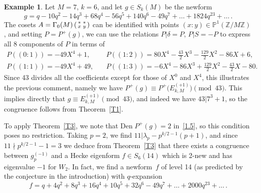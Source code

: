 \documentclass{amsart}
\theoremstyle{plain}
\theoremstyle{definition}
\newtheorem{example}[theorem]{Example}
\numberwithin{equation}{section}
\newcommand{\Z}{{\mathbb Z}}
\newcommand{\Q}{{\mathbb Q}}
\newcommand{\C}{{\mathbb C}}
\newcommand{\R}{{\mathbb R}}
\def\PP{\mathbb{P}} \def\MM{\mathbb{M}}\def\Q{\mathbb{Q}}\def\R{\mathbb{R}}\def\Z{\mathbb{Z}}\def\C{\mathbb{C}}
\def\dd{\delta} \def\ss{\sigma}\def\wc{\widetilde{\chi}}
\def\sm#1#2#3#4{\left(\begin{smallmatrix}#1&#2 \\ #3 & #4 \end{smallmatrix}\right)}
\def\den{\mathrm{Den}\;}
\begin{document}
\begin{example}\label{ex3} Let $M=7$, $k=6$, and let $g\in S_k(M)$ be the 
newform  
\[ g=  q - 10 q^2 - 14 q^3 + 68 q^4 - 56 q^5 + 140 q^6 - 49 q^7 +\ldots 
+1824q^{23}+\ldots\,. \] 
The cosets $A=\G_0(M)\sm **xy$ can be identified with points $(x:y)\in 
\PP^1(\Z/M\Z)$, and setting $P=P^+(g)$, we can use the relations 
$P|\dd=P$, $P|S=-P$ to express all 8 components of $P$ in terms of 
\[\begin{aligned}
  P((0:1))=-49X^4 + 1, \quad & 
  P((1:2))=80X^4 - \frac{43}2 X^3 - \frac{129}2 X^2 - 86X + 6, \\
  P((1:1))=-49X^4 + 49, \quad & 
  P((1:3))=-6X^4 - 86X^3 + \frac{129}2 X^2 - \frac{43}2 X - 80.
   \end{aligned}
\]
Since 43 divides all the coefficients except for those of $X^0$ and $X^4$, this 
illustrates the previous comment, namely we have 
$P^+(g)\equiv P^+\big(E_{k,M}^{(+1)}\big)\!\!\pmod{43}$.
This implies directly that $g\equiv E_{k,M}^{(+1)} \pmod{43}$, and  
indeed we have $43|7^3+1$, so the congruence follows from Theorem~\ref{T1}. 

To apply Theorem~\ref{T3}, we note that $\den P^+(g)=2$ in~\eqref{1.5}, 
so this condition poses no restriction. 
Taking $p=2$, we find $11|\lambda_p-p^{k/2-1}(p+1)$, and since 
$11\nmid p^{k/2-1}-1=3$ we deduce from Theorem~\ref{T3} that there exists 
a congruence between $g_p^{(-1)}$  
and a Hecke eigenform $f\in S_6(14)$ which is 2-new and has eigenvalue $-1$ for $W_2$. 
In fact, we find a newform~$f$ of level 14
(as predicted by the conjecture in the introduction)  with $q$-expansion 
\[f=q + 4q^2 + 8q^3 + 16q^4 + 10q^5 + 32q^6 - 49q^7+\ldots +2000q^{23}+\ldots \,. \]
\end{example}
\end{document}
